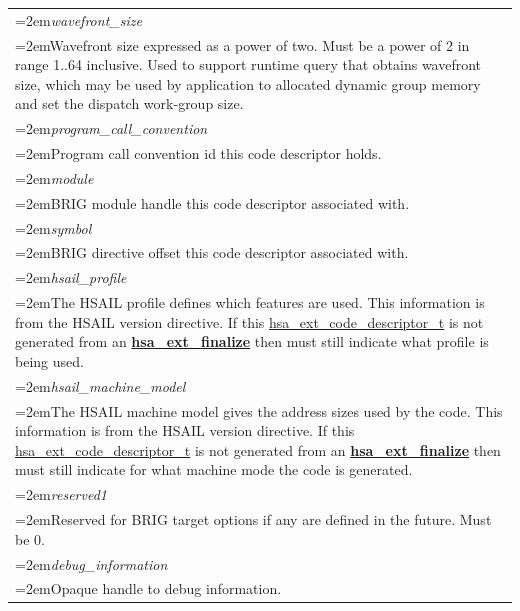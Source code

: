 \documentclass[final]{book}
\newcommand{\reffun}[1]{\textbf{#1}}
\newcommand{\reffld}[1]{\textit{#1}}
\begin{document}
\begin{longtable}{@{}>{\hangindent=2em}p{\textwidth}}
\reffld{wavefront_\-size}\\\hspace{2em}Wavefront size expressed as a power of two. Must be a power of 2 in range 1..64 inclusive. Used to support runtime query that obtains wavefront size, which may be used by application to allocated dynamic group memory and set the dispatch work-group size.\\[2mm]
\reffld{program_\-call_\-convention}\\\hspace{2em}Program call convention id this code descriptor holds.\\[2mm]
\reffld{module}\\\hspace{2em}BRIG module handle this code descriptor associated with.\\[2mm]
\reffld{symbol}\\\hspace{2em}BRIG directive offset this code descriptor associated with.\\[2mm]
\reffld{hsail_\-profile}\\\hspace{2em}The HSAIL profile defines which features are used. This information is from the HSAIL version directive. If this \hyperlink{group__finalizer_1ga0e01eabc57d7105ea37e1abbb50fa337}{hsa_\-ext_\-code_\-descriptor_\-t} is not generated from an \hyperlink{group__finalizer_1gad42cf738ed29770a7cec53fc13009a93}{\reffun{hsa_\-ext_\-finalize}} then must still indicate what profile is being used.\\[2mm]
\reffld{hsail_\-machine_\-model}\\\hspace{2em}The HSAIL machine model gives the address sizes used by the code. This information is from the HSAIL version directive. If this \hyperlink{group__finalizer_1ga0e01eabc57d7105ea37e1abbb50fa337}{hsa_\-ext_\-code_\-descriptor_\-t} is not generated from an \hyperlink{group__finalizer_1gad42cf738ed29770a7cec53fc13009a93}{\reffun{hsa_\-ext_\-finalize}} then must still indicate for what machine mode the code is generated.\\[2mm]
\reffld{reserved1}\\\hspace{2em}Reserved for BRIG target options if any are defined in the future. Must be 0.\\[2mm]
\reffld{debug_\-information}\\\hspace{2em}Opaque handle to debug information.\\[2mm]

\end{longtable}
\end{document}
